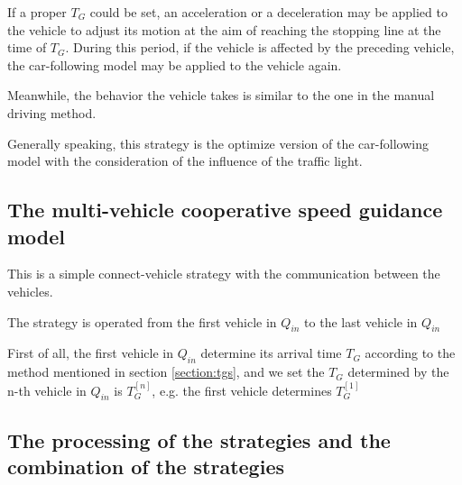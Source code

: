 \documentclass[a4paper]{paper}
\begin{document}
If a proper $T_G$ could be set, an acceleration or a deceleration may be applied to the vehicle to adjust its motion at the aim of reaching the stopping line at the time of $T_G$. During this period, if the vehicle is affected by the preceding vehicle, the car-following model may be applied to the vehicle again.

Meanwhile, the behavior the vehicle takes is similar to the one in the manual driving method.

Generally speaking, this strategy is the optimize version of the car-following model with the consideration of the influence of the traffic light.
\subsection{The multi-vehicle cooperative speed guidance model}
This is a simple connect-vehicle strategy with the communication between the vehicles.

The strategy is operated from the first vehicle in $Q_{in}$ to the last vehicle in $Q_{in}$

First of all, the first vehicle in $Q_{in}$ determine its arrival time $T_G$ according to the method mentioned in section \ref{section:tgs}, and we set the $T_G$ determined by the n-th vehicle in $Q_{in}$ is $T_G^{[n]}$, e.g. the first vehicle determines $T_G^{[1]}$
\subsection{The processing of the strategies and the combination of the strategies}
\end{document}
